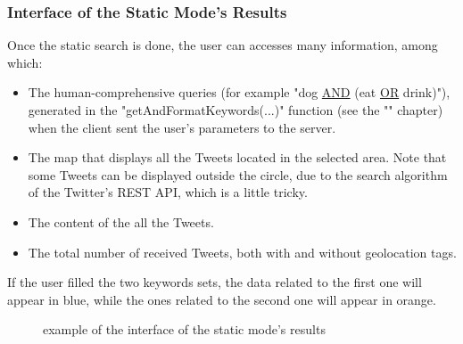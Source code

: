 \documentclass[a4paper,11pt]{report}
\begin{document}
\subsubsection{Interface of the Static Mode's Results}
Once the static search is done, the user can accesses many information, among which:
\begin{itemize}
	\item The human-comprehensive queries (for example "dog \underline{AND} (eat \underline{OR} drink)"), generated in the "getAndFormatKeywords(...)" function (see the "" chapter) when the client sent the user's parameters to the server.
	\item The map that displays all the Tweets located in the selected area. Note that some Tweets can be displayed outside the circle, due to the search algorithm of the Twitter's REST API, which is a little tricky.
	\item The content of the all the Tweets.
	\item The total number of received Tweets, both with and without geolocation tags.
\end{itemize}
\newpage

If the user filled the two keywords sets, the data related to the first one will appear in \color{blue}blue\color{black}, while the ones related to the second one will appear in \color{Orange}orange\color{black}.
\begin{figure}[H]
\vspace{-5pt}
\begin{center}
\vspace{-20pt}
\caption{example of the interface of the static mode's results}
\end{center}
\end{figure}
\vspace{-10pt}
\end{document}
